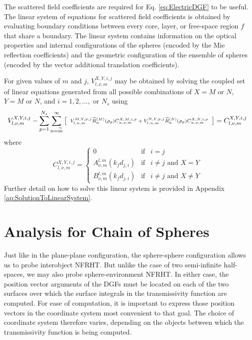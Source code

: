The scattered field coefficients are required for Eq. \ref{eq:ElectricDGF} to be useful. The linear system of equations for scattered field coefficients is obtained by evaluating boundary conditions between every core, layer, or free-space region $f$ that share a boundary. The linear system contains information on the optical properties and internal configurations of the spheres (encoded by the Mie reflection coefficients) and the geometric configuration of the ensemble of spheres (encoded by the vector additional translation coefficients). 

For given values of $m$ and $j$, $V_{l, \nu, m}^{X,Y,i,j}$ may be obtained by solving the coupled set of linear equations generated from all possible combinations of $X=M$ or $N$, $Y = M$ or $N$, and $i = 1,2,...,$ or $N_{s}$ using
%
\begin{equation}\label{eq:ScatteredFieldEquations} \scriptsize
V_{l, \nu, m}^{X,Y,i,j} - \sum_{p=1}^{N_{s}} \sum_{n = \widetilde{m}}^{\infty}
\left[ \begin{array}{r}
V_{l,n,m}^{M,Y,p,j} \widetilde{R}_{n}^{(M)}(\rho_{p}) C_{n,\nu,m}^{X,M,i,p}
+ V_{l,n,m}^{N,Y,p,j} \widetilde{R}_{n}^{(N)}(\rho_{p}) C_{n,\nu,m}^{X,N,i,p}
\end{array} \right]
= C_{l, \nu, m}^{X,Y,i,j}
\end{equation}
%
where
%
\begin{equation}\label{eq:TranslationCoefficients}
C_{l, \nu, m}^{X,Y,i,j} \! = \! \left\{ \! \!
\begin{array}{cll}
0 & \! \! \text{if} & \! \! i \! = \! j
\\
A_{\nu,m}^{l,m}\left( k_{f} d_{j,i} \right) & \! \! \text{if} & \! \! i \! \neq \! j \text{ and } X \! = \! Y
\\
\! B_{\nu,m}^{l,m}\left( k_{f} d_{j,i} \right) & \! \! \text{if} & \! \! i \! \neq \! j \text{ and } X \! \neq \! Y
\end{array}
\! \! \right.
\end{equation}
%
Further detail on how to solve this linear system is provided in Appendix \ref{ap:SolutionToLinearSystem}.


\section{Analysis for Chain of Spheres}
%
Just like in the plane-plane configuration, the sphere-sphere configuration allows us to probe interobject NFRHT. But unlike the case of two semi-infinite half-spaces, we may also probe sphere-environment NFRHT. In either case, the position vector arguments of the DGFs must be located on each of the two surfaces over which the surface integrals in the transmissivity function are computed. For ease of computation, it is important to express those position vectors in the coordinate system most convenient to that goal. The choice of coordinate system therefore varies, depending on the objects between which the transmissivity function is being computed.

